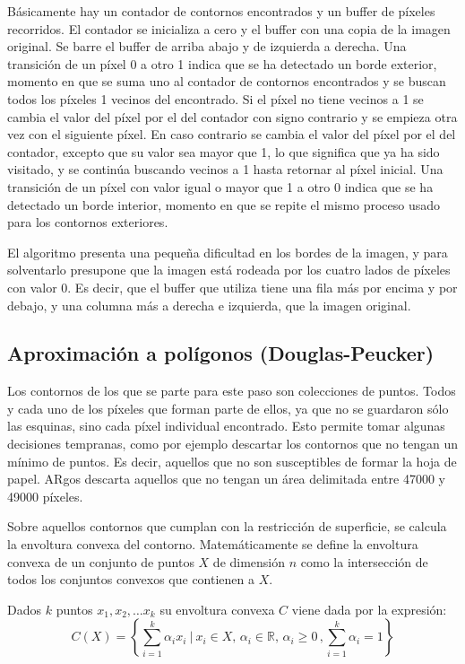 Básicamente hay un contador de contornos encontrados y un buffer de píxeles recorridos. El contador
se inicializa a cero y el buffer con una copia de la imagen original. Se barre el buffer de arriba
abajo y de izquierda a derecha. Una transición de un píxel 0 a otro 1 indica que se ha detectado un
borde exterior, momento en que se suma uno al contador de contornos encontrados y se buscan todos
los píxeles 1 vecinos del encontrado. Si el píxel no tiene vecinos a 1 se cambia el valor del píxel
por el del contador con signo contrario y se empieza otra vez con el siguiente píxel. En caso
contrario se cambia el valor del píxel por el del contador, excepto que su valor sea mayor que 1, lo
que significa que ya ha sido visitado, y se continúa buscando vecinos a 1 hasta retornar al píxel
inicial. Una transición de un píxel con valor igual o mayor que 1 a otro 0 indica que se ha
detectado un borde interior, momento en que se repite el mismo proceso usado para los contornos
exteriores.

El algoritmo presenta una pequeña dificultad en los bordes de la imagen, y para solventarlo
presupone que la imagen está rodeada por los cuatro lados de píxeles con valor 0. Es decir, que el
buffer que utiliza tiene una fila más por encima y por debajo, y una columna más a derecha e
izquierda, que la imagen original.


\subsection{Aproximación a polígonos (Douglas-Peucker)}
Los contornos de los que se parte para este paso son colecciones de puntos. Todos y cada uno de los
píxeles que forman parte de ellos, ya que no se guardaron sólo las esquinas, sino cada píxel
individual encontrado. Esto permite tomar algunas decisiones tempranas, como por ejemplo descartar
los contornos que no tengan un mínimo de puntos. Es decir, aquellos que no son susceptibles de formar
la hoja de papel. ARgos descarta aquellos que no tengan un área delimitada entre 47000 y 49000
píxeles.

Sobre aquellos contornos que cumplan con la restricción de superficie, se calcula la envoltura
convexa del contorno. Matemáticamente se define la envoltura convexa de un conjunto de puntos $X$ de
dimensión $n$ como la intersección de todos los conjuntos convexos que contienen a $X$.

Dados $k$ puntos $x_1, x_2,\dots x_k$ su envoltura convexa $C$ viene dada por la expresión:
\begin{equation}
C(X) =\left\{\sum_{i=1}^k \alpha_i x_i \ \Bigg | \ x_i\in X, \, \alpha_i\in \mathbb{R}, \, \alpha_i \geq 0 \, , \sum_{i=1}^k \alpha_i=1\right\}
\end{equation}

